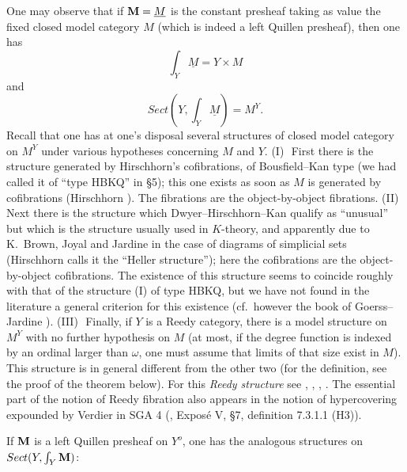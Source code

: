 One may observe that if ${\bf M} = \underline{M}$ is the constant presheaf taking as
value the fixed closed model category $M$ (which is indeed a left Quillen
presheaf), then one has
$$
\int _Y\underline{M} = Y\times M
$$
and
$$
Sect (Y,\int _Y\underline{M}) = M^Y.
$$
Recall that one has at one's disposal several structures of closed model
category on $M^Y$ under various hypotheses concerning $M$ and $Y$.
\newline
(I)\,\, First there is the structure generated by Hirschhorn's cofibrations, of
Bousfield--Kan type (we had called it of ``type HBKQ'' in \S5);
this one exists as soon as $M$ is
generated by cofibrations (Hirschhorn \cite{Hirschhorn}). The fibrations are
the object-by-object fibrations.
\newline
(II)\,\, Next there is the structure which Dwyer--Hirschhorn--Kan qualify as
``unusual'' but which is the structure usually used in $K$-theory, and
apparently due to K.~Brown, Joyal and Jardine in the case of diagrams of
simplicial sets (Hirschhorn calls it the ``Heller structure''); here the
cofibrations are the object-by-object cofibrations. The existence of this
structure seems to coincide roughly with that of the structure (I) of type
HBKQ, but we have not found in the literature a general criterion for this
existence (cf.\ however the book of Goerss--Jardine \cite{JardineGoerssBook}).
\newline
(III)\,\, Finally, if $Y$ is a Reedy category, there is a model structure on
$M^Y$ with no further hypothesis on $M$ (at most, if the degree function is
indexed by an ordinal larger than $\omega$, one must assume that limits of that
size exist in $M$). This structure is in general different from the other two
(for the definition, see the proof of the theorem below). For this {\em Reedy
structure} see \cite{Reedy}, \cite{Hirschhorn}, \cite{DHK},
\cite{JardineGoerssBook}. The essential part of the notion of Reedy fibration
also appears in the notion of hypercovering expounded by Verdier in SGA 4
(\cite{SGA4b}, Exposé V, \S7, definition 7.3.1.1 (H3)).

If ${\bf M}$ is a left Quillen presheaf on $Y^o$, one has the analogous structures
on $Sect (Y,\int _Y{\bf M} )$:

